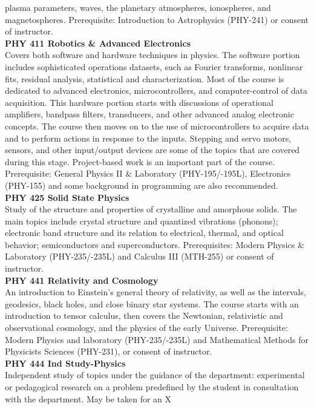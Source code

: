 \documentclass[
  letterpaper,
]{scrbook}
\begin{document}
plasma parameters, waves, the planetary atmospheres, ionospheres, and
magnetospheres. Prerequisite: Introduction to Astrophysics (PHY-241) or
consent of instructor.\\
\textbf{PHY 411 Robotics \& Advanced Electronics}\\
Covers both software and hardware techniques in physics. The software
portion includes sophisticated operations datasets, such as Fourier
transforms, nonlinear fits, residual analysis, statistical and
characterization. Most of the course is dedicated to advanced
electronics, microcontrollers, and computer-control of data acquisition.
This hardware portion starts with discussions of operational amplifiers,
bandpass filters, transducers, and other advanced analog electronic
concepts. The course then moves on to the use of microcontrollers to
acquire data and to perform actions in response to the inputs. Stepping
and servo motors, sensors, and other input/output devices are some of
the topics that are covered during this stage. Project-based work is an
important part of the course. Prerequisite: General Physics II \&
Laboratory (PHY-195/-195L), Electronics (PHY-155) and some background in
programming are also recommended.\\
\textbf{PHY 425 Solid State Physics}\\
Study of the structure and properties of crystalline and amorphous
solids. The main topics include crystal structure and quantized
vibrations (phonons); electronic band structure and its relation to
electrical, thermal, and optical behavior; semiconductors and
superconductors. Prerequisites: Modern Physics \& Laboratory
(PHY-235/-235L) and Calculus III (MTH-255) or consent of instructor.\\
\textbf{PHY 441 Relativity and Cosmology}\\
An introduction to Einstein's general theory of relativity, as well as
the intervals, geodesics, black holes, and close binary star systems.
The course starts with an introduction to tensor calculus, then covers
the Newtonian, relativistic and observational cosmology, and the physics
of the early Universe. Prerequisite: Modern Physics and laboratory
(PHY-235/-235L) and Mathematical Methods for Physicists Sciences
(PHY-231), or consent of instructor.\\
\textbf{PHY 444 Ind Study-Physics}\\
Independent study of topics under the guidance of the department:
experimental or pedagogical research on a problem predefined by the
student in consultation with the department. May be taken for an X
\end{document}
